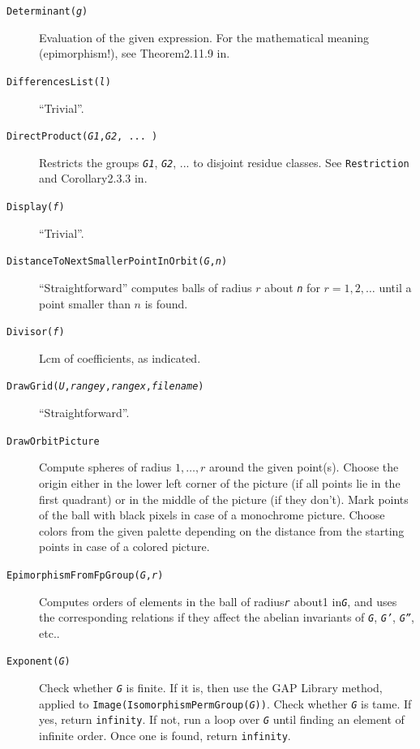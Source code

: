\documentclass[a4paper,11pt]{report}
\begin{document}
{\begin{description}
\item[{ \texttt{Determinant(\mbox{\texttt{\mdseries\slshape g}})} }]  Evaluation of the given expression. For the mathematical meaning
(epimorphism!), see Theorem{\nobreakspace}2.11.9 in{\nobreakspace}\cite{Kohl05}. 
\item[{ \texttt{DifferencesList(\mbox{\texttt{\mdseries\slshape l}})} }]  ``Trivial''. 
\item[{ \texttt{DirectProduct(\mbox{\texttt{\mdseries\slshape G1}},\mbox{\texttt{\mdseries\slshape G2}}, ... )} }]  Restricts the groups \mbox{\texttt{\mdseries\slshape G1}}, \mbox{\texttt{\mdseries\slshape G2}}, ... to disjoint residue classes. See \texttt{Restriction} and Corollary{\nobreakspace}2.3.3 in{\nobreakspace}\cite{Kohl05}. 
\item[{ \texttt{Display(\mbox{\texttt{\mdseries\slshape f}})} }]  ``Trivial''. 
\item[{ \texttt{DistanceToNextSmallerPointInOrbit(\mbox{\texttt{\mdseries\slshape G}},\mbox{\texttt{\mdseries\slshape n}})} }]  ``Straightforward'' \texttt{}\texttt{} computes balls of radius $r$ about \mbox{\texttt{\mdseries\slshape n}} for $r = 1, 2, \dots$ until a point smaller than $n$ is found. 
\item[{ \texttt{Divisor(\mbox{\texttt{\mdseries\slshape f}})} }]  Lcm of coefficients, as indicated. 
\item[{ \texttt{DrawGrid(\mbox{\texttt{\mdseries\slshape U}},\mbox{\texttt{\mdseries\slshape range{\textunderscore}y}},\mbox{\texttt{\mdseries\slshape range{\textunderscore}x}},\mbox{\texttt{\mdseries\slshape filename}})} }]  ``Straightforward''. 
\item[{ \texttt{DrawOrbitPicture} }]  Compute spheres of radius $1, \dots, r$ around the given point(s). Choose the origin either in the lower left corner
of the picture (if all points lie in the first quadrant) or in the middle of
the picture (if they don't). Mark points of the ball with black pixels in case
of a monochrome picture. Choose colors from the given palette depending on the
distance from the starting points in case of a colored picture. 
\item[{ \texttt{EpimorphismFromFpGroup(\mbox{\texttt{\mdseries\slshape G}},\mbox{\texttt{\mdseries\slshape r}})} }]  Computes orders of elements in the ball of radius{\nobreakspace}\mbox{\texttt{\mdseries\slshape r}} about{\nobreakspace}1 in{\nobreakspace}\mbox{\texttt{\mdseries\slshape G}}, and uses the corresponding relations if they affect the abelian invariants
of \mbox{\texttt{\mdseries\slshape G}}, \mbox{\texttt{\mdseries\slshape G'}}, \mbox{\texttt{\mdseries\slshape G''}}, etc.. 
\item[{ \texttt{Exponent(\mbox{\texttt{\mdseries\slshape G}})} }]  Check whether \mbox{\texttt{\mdseries\slshape G}} is finite. If it is, then use the \textsf{GAP} Library method, applied to \texttt{Image(IsomorphismPermGroup(\mbox{\texttt{\mdseries\slshape G}}))}. Check whether \mbox{\texttt{\mdseries\slshape G}} is tame. If yes, return \texttt{infinity}. If not, run a loop over \mbox{\texttt{\mdseries\slshape G}} until finding an element of infinite order. Once one is found, return \texttt{infinity}. 


\end{description}}
\end{document}
